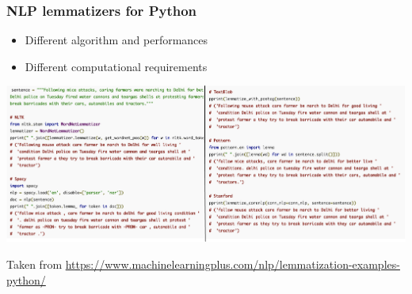 \documentclass{beamer}
\begin{document}
\begin{frame}

\frametitle{NLP lemmatizers for Python}

\footnotesize
\begin{itemize}
    \item Different algorithm and performances
    \item Different computational requirements
\end{itemize}


\centerline{\includegraphics[width=\textwidth]{./figs/lemmas.png}}
\tiny
Taken from \url{https://www.machinelearningplus.com/nlp/lemmatization-examples-python/}
\end{frame}
\end{document}
